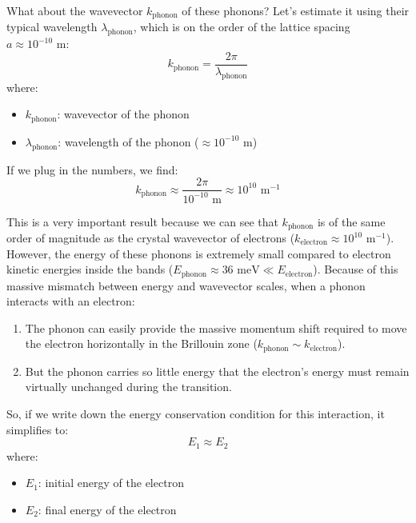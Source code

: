 What about the wavevector $k_\text{phonon}$ of these phonons? Let's estimate it using their typical wavelength $\lambda_\text{phonon}$, which is on the order of the lattice spacing $a \approx 10^{-10}\text{ m}$:
\begin{equation*}
    k_\text{phonon} = \frac{2\pi}{\lambda_\text{phonon}}
\end{equation*}
where:
\begin{itemize}
    \item $k_\text{phonon}$: wavevector of the phonon
    \item $\lambda_\text{phonon}$: wavelength of the phonon ($\approx 10^{-10}\text{ m}$)
\end{itemize}

If we plug in the numbers, we find:
\begin{equation*}
    k_\text{phonon} \approx \frac{2\pi}{10^{-10}\text{ m}} \approx 10^{10}\text{ m}^{-1}
\end{equation*}

This is a very important result because we can see that $k_\text{phonon}$ is of the same order of magnitude as the crystal wavevector of electrons ($k_\text{electron} \approx 10^{10}\text{ m}^{-1}$). However, the energy of these phonons is extremely small compared to electron kinetic energies inside the bands ($E_\text{phonon} \approx 36\text{ meV} \ll E_\text{electron}$). Because of this massive mismatch between energy and wavevector scales, when a phonon interacts with an electron:
\begin{enumerate}
    \item The phonon can easily provide the massive momentum shift required to move the electron horizontally in the Brillouin zone ($k_\text{phonon} \sim k_\text{electron}$).
    \item But the phonon carries so little energy that the electron's energy must remain virtually unchanged during the transition.
\end{enumerate}

So, if we write down the energy conservation condition for this interaction, it simplifies to:
\begin{equation*}
    E_1 \approx E_2
\end{equation*}
where:
\begin{itemize}
    \item $E_1$: initial energy of the electron
    \item $E_2$: final energy of the electron
\end{itemize}

